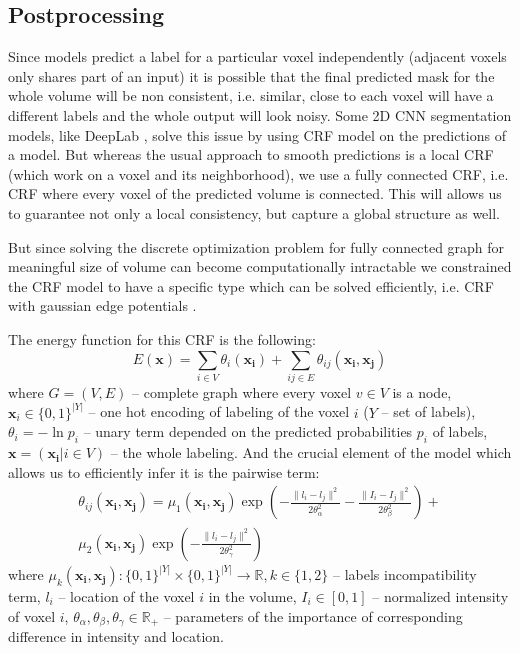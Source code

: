 \documentclass[twocolumn, a4paper]{article}
\theoremstyle{definition}
\begin{document}
\subsection{Postprocessing}
Since models predict a label for a particular voxel independently
(adjacent voxels only shares part of an input) it is possible that the final predicted
mask for the whole volume will be non consistent, i.e. similar, close to each voxel will have
a different labels and the whole output will look noisy. Some 2D CNN segmentation models, like DeepLab \cite{chen2017deeplab},
solve this issue by using CRF model on the predictions of a model. But whereas the usual approach
to smooth predictions is a local CRF (which work on a voxel and its neighborhood), we use a fully connected CRF,
i.e. CRF where every voxel of the predicted volume is connected. This
will allows us to guarantee not only a local consistency, but capture a global structure as well.

But since solving the discrete optimization problem for fully connected graph for meaningful
size of volume can become computationally intractable we constrained the CRF model to have
a specific type which can be solved efficiently, i.e. CRF with gaussian edge potentials \cite{krahenbuhl2011efficient}.

The energy function for this CRF is the following:
\begin{equation*}
    E(\mathbf{x}) =\sum\limits_{i \in V} \theta_i (\mathbf{x_i}) +
    \sum\limits_{ij \in E} \theta_{ij} (\mathbf{x_i}, \mathbf{x_j})
\end{equation*}
where \( G = (V, E) \) -- complete graph where every voxel \( v \in V \) is a node,
\(\mathbf{x}_i \in \{0, 1\}^{|Y|} \) -- one hot encoding of labeling of the voxel \( i \) (\(Y\) -- set of labels),
\( \theta_i = -\ln{p_i} \) -- unary term depended on the predicted probabilities \( p_i \) of labels,
\(\mathbf{x} = (\mathbf{x_i} | i \in V) \) -- the whole labeling.
And the crucial element of the model which allows us to efficiently infer it is the pairwise term:
\begin{equation}  \label{eq:crf_pairwise_term}
    \begin{aligned}
        \theta_{ij} (\mathbf{x_i}, \mathbf{x_j}) = \mu_1(\mathbf{x_i}, \mathbf{x_j})
        \exp \left( -\frac{\| l_i - l_j \|^2}{2 \theta_{\alpha}^2}
        -\frac{\| I_i - I_j \|^2}{2 \theta_{\beta}^2} \right) + \\
        \mu_2 (\mathbf{x_i}, \mathbf{x_j}) \exp \left( -\frac{\| l_i - l_j \|^2}{2 \theta_{\gamma}^2} \right)
    \end{aligned}
\end{equation}
where \( \mu_k(\mathbf{x_i}, \mathbf{x_j}): \{0, 1\}^{|Y|} \times \{0, 1\}^{|Y|} \to \mathbb{R}, k \in \{ 1, 2 \} \)
-- labels incompatibility term, \( l_i \) -- location of the voxel \( i \) in the volume,
\( I_i \in [0, 1] \) -- normalized intensity of voxel \( i \),
\( \theta_{\alpha}, \theta_{\beta}, \theta_{\gamma} \in \mathbb{R}_+ \) -- parameters of the
importance of corresponding difference in intensity and location.
\end{document}
